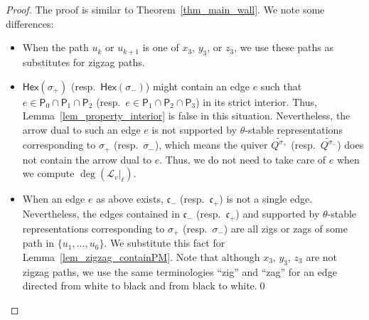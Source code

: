 \documentclass[pdftex]{sigma}
\numberwithin{equation}{section}
\theoremstyle{definition}
\newcommand{\calL}{\mathcal{L}}
\newcommand{\fkc}{\mathfrak{c}}
\newcommand{\sfP}{\mathsf{P}}
\newcommand{\Hex}{\mathsf{Hex}}
\begin{document}
\begin{proof}
The proof is similar to Theorem~\ref{thm_main_wall}. We note some differences:
\begin{itemize}\itemsep=0pt
\item When the path $u_k$ or $u_{k+1}$ is one of $x_3$, $y_3$, or $z_3$, we use these paths as substitutes for zigzag paths.
\item $\Hex(\sigma_+)$ (resp.\ $\Hex(\sigma_-)$) might contain an edge $e$ such that $e\in\sfP_0\cap\sfP_1\cap\sfP_2$ (resp.\ $e\in\sfP_1\cap\sfP_2\cap\sfP_3$) in its strict interior.
Thus, Lemma~\ref{lem_property_interior} is false in this situation.
Nevertheless, the arrow dual to such an edge $e$ is not supported by $\theta$-stable representations corresponding to $\sigma_+$ (resp.\ $\sigma_-$),
which means the quiver $\widetilde{Q^{\sigma_+}}$ (resp.\ $\widetilde{Q^{\sigma_-}}$) does not contain the arrow dual to $e$.
Thus, we do not need to take care of $e$ when we compute $\deg(\calL_v |_\ell)$.
\item When an edge $e$ as above exists, $\fkc_-$ (resp.\ $\fkc_+$) is not a single edge.
Nevertheless, the edges contained in $\fkc_-$ (resp.\ $\fkc_+$) and supported by $\theta$-stable representations corresponding to
$\sigma_+$ (resp.\ $\sigma_-$) are all zigs or zags of some path in $\{u_1, \dots, u_6\}$. We substitute this fact for Lemma~\ref{lem_zigzag_containPM}.
Note that although $x_3$, $y_3$, $z_3$ are not zigzag paths, we use the same terminologies ``zig'' and ``zag'' for an edge directed from white to black and from black to white.\hfill \qed
\end{itemize}\renewcommand{\qed}{}
\end{proof}
\end{document}
